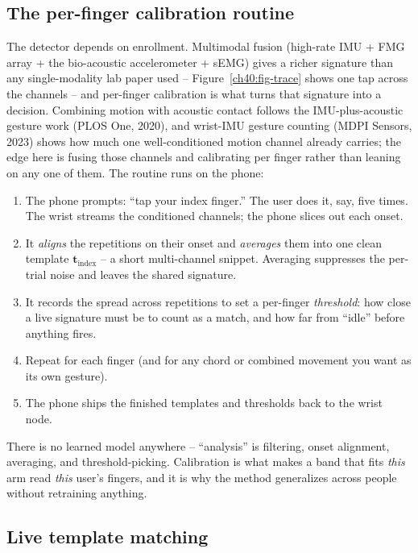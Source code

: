 \subsection{The per-finger calibration routine}

The detector depends on enrollment. Multimodal fusion (high-rate IMU + FMG array + the bio-acoustic
accelerometer + sEMG) gives a richer signature than any single-modality lab paper used --
Figure~\ref{ch40:fig-trace} shows one tap across the channels -- and
per-finger calibration is what turns that signature into a decision. Combining motion with acoustic
contact follows the IMU-plus-acoustic gesture work (PLOS One, 2020), and wrist-IMU gesture counting
(MDPI Sensors, 2023) shows how much one well-conditioned motion channel already carries; the edge
here is fusing those channels and calibrating per finger rather than leaning on any one of them. The
routine runs on the phone:

\begin{enumerate}
  \item The phone prompts: ``tap your index finger.'' The user does it, say, five times. The wrist
    streams the conditioned channels; the phone slices out each onset.
  \item It \emph{aligns} the repetitions on their onset and \emph{averages} them into one clean
    template $\mathbf{t}_{\text{index}}$ -- a short multi-channel snippet. Averaging suppresses the
    per-trial noise and leaves the shared signature.
  \item It records the spread across repetitions to set a per-finger \emph{threshold}: how close a
    live signature must be to count as a match, and how far from ``idle'' before anything fires.
  \item Repeat for each finger (and for any chord or combined movement you want as its own gesture).
  \item The phone ships the finished templates and thresholds back to the wrist node.
\end{enumerate}

There is no learned model anywhere -- ``analysis'' is filtering, onset alignment, averaging, and
threshold-picking. Calibration is what makes a band that fits \emph{this} arm read \emph{this}
user's fingers, and it is why the method generalizes across people without retraining anything.

\subsection{Live template matching}

